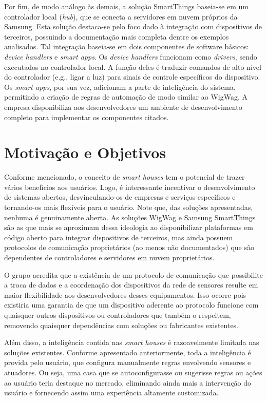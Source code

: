 Por fim, de modo análogo às demais, a solução SmartThings baseia-se em um controlador local (\textit{hub}), que se conecta a servidores em nuvem próprios da Samsung. Esta solução destaca-se pelo foco dado à integração com dispositivos de terceiros, possuindo a documentação mais completa dentre os exemplos analisados. Tal integração baseia-se em dois componentes de software básicos: \textit{device handlers} e \textit{smart apps}. Os \textit{device handlers} funcionam como \textit{drivers}, sendo executados no controlador local. A função deles é traduzir comandos de alto nível do controlador (e.g., ligar a luz) para sinais de controle específicos do dispositivo. Os \textit{smart apps}, por sua vez, adicionam a parte de inteligência do sistema, permitindo a criação de regras de automação de modo similar ao WigWag. A empresa disponibiliza aos desenvolvedores um ambiente de desenvolvimento completo para implementar os componentes citados.

\section{Motivação e Objetivos}\label{sec:goals}
Conforme mencionado, o conceito de \textit{smart houses} tem o potencial de trazer vários benefícios aos usuários. Logo, é interessante incentivar o desenvolvimento de sistemas abertos, desvinculando-os de empresas e serviços específicos e tornando-os mais flexíveis para o usuário. Note que, das soluções apresentadas, nenhuma é genuinamente aberta. As soluções WigWag e Samsung SmartThings são as que mais se aproximam dessa ideologia ao disponibilizar plataformas em código aberto para integrar dispositivos de terceiros, mas ainda possuem protocolos de comunicação proprietários (ao menos não documentados) que são dependentes de controladores e servidores em nuvem proprietários.

O grupo acredita que a existência de um protocolo de comunicação que possibilite a troca de dados e a coordenação dos dispositivos da rede de sensores resulte em maior flexibilidade aos desenvolvedores desses equipamentos. Isso ocorre pois existiria uma garantia de que um dispositivo aderente ao protocolo funcione com quaisquer outros dispositivos ou controladores que também o respeitem, removendo quaisquer dependências com soluções ou fabricantes existentes.

Além disso, a inteligência contida nas \textit{smart houses} é razoavelmente limitada nas soluções existentes. Conforme apresentado anteriormente, toda a inteligência é provida pelo usuário, que configura manualmente regras envolvendo sensores e atuadores. Ou seja, uma casa que se autoconfigurasse ou sugerisse regras ou ações ao usuário teria destaque no mercado, eliminando ainda mais a intervenção do usuário e fornecendo assim uma  experiência altamente customizada.

